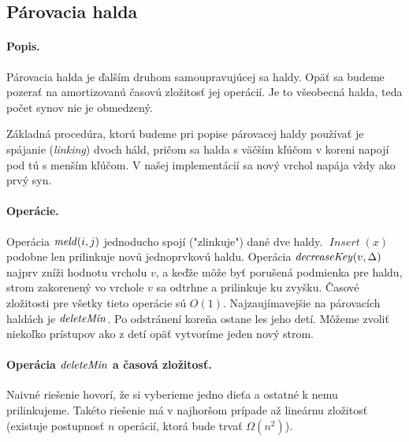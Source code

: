 \subsection{Párovacia halda} 
\paragraph{Popis.}
Párovacia halda je ďalším druhom samoupravujúcej sa haldy. Opäť sa budeme pozerať na amortizovanú časovú zložitosť jej operácií.
Je to všeobecná halda, teda počet synov nie je obmedzený.

Základná procedúra, ktorú budeme pri popise párovacej haldy používať je spájanie (\emph{linking}) dvoch háld,
pričom sa halda s väčším kľúčom v koreni napojí pod tú s menším kľúčom.
V našej implementácií sa nový vrchol napája vždy ako prvý syn.

\paragraph{Operácie.}
Operácia $\mathop{\mathit{meld}}(i,j)$ jednoducho spojí ("zlinkuje") dané dve haldy. $\mathop{\mathit{Insert}}(x)$ podobne len prilinkuje
novú jednoprvkovú haldu.
Operácia $\mathop{\mathit{decreaseKey}}(v, \Delta)$ najprv zníži hodnotu vrcholu $v$, a keďže môže byť porušená podmienka pre haldu,
strom zakorenený vo vrchole $v$ sa odtrhne a prilinkuje ku zvyšku. Časové zložitosti pre všetky tieto operácie
sú $O(1)$. Najzaujímavejšie na párovacích haldách je $\mathop{\mathit{deleteMin}}$. Po odstránení koreňa ostane les jeho detí.
Môžeme zvoliť niekoľko prístupov ako z detí opäť vytvoríme jeden nový strom.



\paragraph{Operácia $\mathop{\mathit{deleteMin}}$ a časová zložitosť.}
Naivné riešenie hovorí, že si vyberieme jedno dieťa a ostatné k nemu prilinkujeme.
Takéto riešenie má v najhoršom prípade až lineárnu zložitosť (existuje postupnosť $n$ operácií,
ktorá bude trvať $\Omega(n^2)$).


